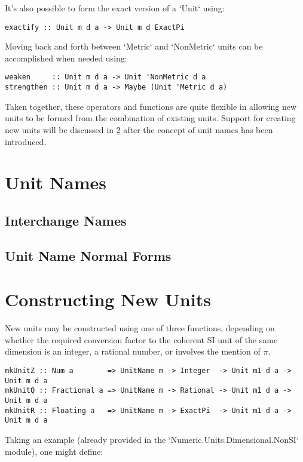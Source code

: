 \documentclass[11pt]{report}
\begin{document}
It's also possible to form the exact version of a `Unit` using:

\begin{lstlisting}
exactify :: Unit m d a -> Unit m d ExactPi
\end{lstlisting}

Moving back and forth between `Metric` and `NonMetric` units can be accomplished when needed using:

\begin{lstlisting}
weaken     :: Unit m d a -> Unit 'NonMetric d a
strengthen :: Unit m d a -> Maybe (Unit 'Metric d a)
\end{lstlisting}

Taken together, these operators and functions are quite flexible in allowing new units to be formed from
the combination of existing units. Support for creating new units will be discussed in \ref{constructing-new-units} after
the concept of unit names has been introduced.

\section{Unit Names}

\subsection{Interchange Names}
\subsection{Unit Name Normal Forms}

\section{Constructing New Units} \label{constructing-new-units}

New units may be constructed using one of three functions, depending on whether the required conversion factor to the coherent
SI unit of the same dimension is an integer, a rational number, or involves the mention of $ \pi $.

\begin{lstlisting}
mkUnitZ :: Num a        => UnitName m -> Integer  -> Unit m1 d a -> Unit m d a
mkUnitQ :: Fractional a => UnitName m -> Rational -> Unit m1 d a -> Unit m d a
mkUnitR :: Floating a   => UnitName m -> ExactPi  -> Unit m1 d a -> Unit m d a
\end{lstlisting}

Taking an example (already provided in the `Numeric.Units.Dimensional.NonSI` module), one might define:
\end{document}

